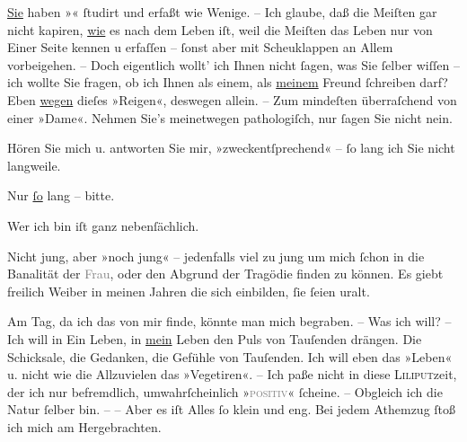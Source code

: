 \pstart
           \uline{Sie} haben »\textsc{\label{K_L04551-2v}\label{K_L04551-2}}«{ }ſtudirt und erfaßt wie Wenige. – Ich glaube, daß die Meiſten gar nicht
               kapiren, \uline{wie} es nach dem Leben iſt, weil die Meiſten
               das Leben nur von Einer Seite kennen u erfaſſen –{ }ſonst aber mit Scheuklappen an
               Allem vorbeigehen. – Doch eigentlich wollt’ ich Ihnen nicht{ }ſagen, was Sie{ }ſelber
               wiſſen – ich wollte Sie fragen, ob ich Ihnen als einem, als \uline{meinem} Freund{ }ſchreiben darf? Eben \uline{wegen} dieſes »Reigen«, deswegen allein.
               – Zum mindeſten überraſchend von einer »Dame«. Nehmen Sie’s meinetwegen pathologiſch,
               nur{ }ſagen Sie nicht nein.\pend
           
\pstart
           Hören Sie mich u. antworten Sie mir, »zweckentſprechend« –{ }ſo lang ich Sie nicht
               langweile.\pend
           
\pstart
           Nur \uline{ſo} lang – bitte.\pend
           
\pstart
           Wer ich bin iſt ganz nebenſächlich.\pend
           
\pstart
           Nicht jung, aber »noch jung« – jedenfalls viel zu jung um mich{ }ſchon in die Banalität
               der \textcolor{gray}{Frau}, oder den Abgrund der Tragödie finden zu können. Es giebt
               freilich Weiber in meinen Jahren die sich einbilden,{ }ſie{ }ſeien uralt.\pend
           
\pstart
           Am Tag, da ich das von mir finde, könnte man mich begraben. – Was ich will? – Ich
               will in Ein Leben, in \uline{mein} Leben {\pb}den Puls von Tauſenden drängen. Die
               Schicksale, die Gedanken, die Gefühle von Tauſenden. Ich will eben das »Leben« u.
               nicht wie die Allzuvielen das »Vegetiren«. – Ich paße nicht in diese \textsc{Liliput}zeit, der ich nur befremdlich, umwahrſcheinlich »\textsc{\textcolor{gray}{positiv}}«{ }ſcheine. – Obgleich ich die Natur{ }ſelber bin. – – Aber es iſt Alles{ }ſo klein
               und eng. Bei jedem Athemzug{ }ſtoß ich mich am Hergebrachten.\pend
           
